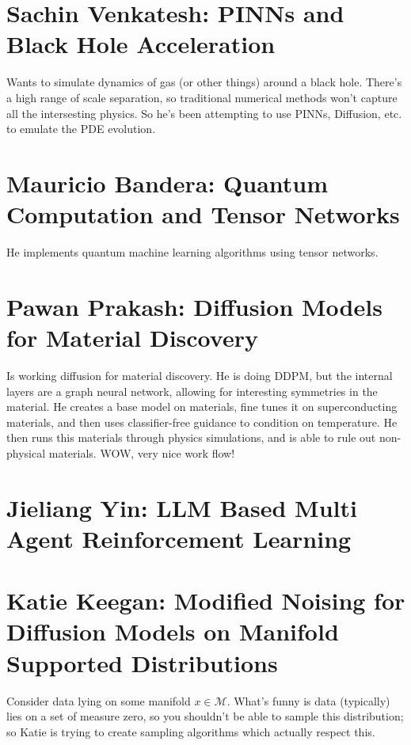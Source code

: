 \section{Sachin Venkatesh: PINNs and Black Hole Acceleration}
Wants to simulate dynamics of gas (or other things) around a black hole. There's a high range of scale separation, so traditional numerical methods won't capture all the intersesting physics. So he's been attempting to use PINNs, Diffusion, etc. to emulate the PDE evolution.

\section{Mauricio Bandera: Quantum Computation and Tensor Networks}
He implements quantum machine learning algorithms using tensor networks.


\section{Pawan Prakash: Diffusion Models for Material Discovery}
Is working diffusion for material discovery. He is doing DDPM, but the internal layers are a graph neural network, allowing for interesting symmetries in the material. He creates a base model on materials, fine tunes it on superconducting materials, and then uses classifier-free guidance to condition on temperature. He then runs this materials through physics simulations, and is able to rule out non-physical materials. WOW, very nice work flow!

\section{Jieliang Yin: LLM Based Multi Agent Reinforcement Learning}

\section{Katie Keegan: Modified Noising for Diffusion Models on Manifold Supported Distributions}
Consider data lying on some manifold $x \in \mathcal M$. What's funny is data (typically) lies on a set of measure zero, so you shouldn't be able to sample this distribution; so Katie is trying to create sampling algorithms which actually respect this.

























